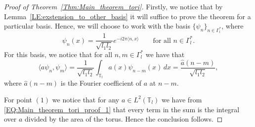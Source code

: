 \documentclass[11pt,twoside,reqno]{amsart}
\newcommand{\1}{\mathrm{\mathbf{1}}}
\numberwithin{equation}{section}
\theoremstyle{plain}
\theoremstyle{definition}
\theoremstyle{remark}
\begin{document}
\begin{proof}[Proof of Theorem~\ref{Thm:Main_theorem_tori}]
Firstly, we notice that by Lemma~\ref{LE:exstension_to_other_basis} it will suffice to prove the theorem for a particular basis. Hence, we will choose to work with the basis $\{\psi_{n} \}_{n\in \Gamma_l^{*}}$, where 
\begin{equation*}
\psi_{n}(x) = \frac{1}{ \sqrt{l_1 l_2}}e^{-i2\pi \langle n,x\rangle } \qquad\text{for all $n\in \Gamma_l^{*}$.} 
\end{equation*}
For this basis, we notice that for all $n,m\in\Gamma_l^{*}$ we have that
\begin{equation}\label{EQ:Main_theorem_tori_proof_1}
        \langle a \psi_n, \psi_m \rangle =  \frac{1}{ \sqrt{l_1 l_2}}  \int_{\mathbb{T}_{l}} a(x) \psi_{n-m}(x) \, dx = \frac{\hat{a}(n-m)}{ \sqrt{l_1 l_2}},
\end{equation}
where $\hat{a}(n-m)$ is the Fourier coefficient of $a$ at $n-m$.

For point $(1)$ we notice that for any $a\in L^2(\mathbb{T}_{l})$ we have from \eqref{EQ:Main_theorem_tori_proof_1} that every term in the sum is the integral over $a$ divided by the area of the torus. Hence the conclusion follows.


\end{proof}
\end{document}
